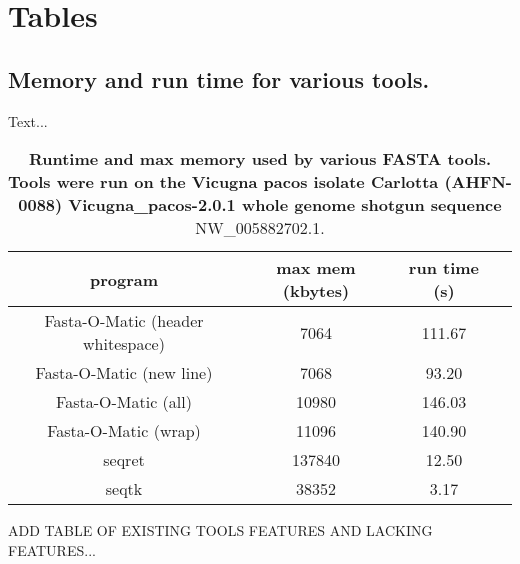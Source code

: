 \section*{Tables}
\subsection{Memory and run time for various tools.}

Text...  

\begin{table}
\begin{center}
    \begin{tabular}{cccc}
        \hline
        \textbf{program} & \textbf{max mem (kbytes)}  & \textbf{run time (s)}  \\ \hline
        Fasta-O-Matic (header whitespace) & 7064 & 111.67 \\
        Fasta-O-Matic (new line) & 7068 & 93.20  \\			  
        Fasta-O-Matic (all)          & 10980      & 146.03     \\   
        Fasta-O-Matic (wrap)          & 11096      & 140.90     \\ 
        seqret          & 137840      & 12.50     \\              
        seqtk          & 38352      & 3.17      \\  \hline
    \end{tabular}
\end{center}
\caption{\textbf{Runtime and max memory used by various FASTA tools. Tools were run on the Vicugna pacos isolate Carlotta (AHFN-0088) Vicugna_pacos-2.0.1 whole genome shotgun sequence} NW_005882702.1.}
\end{table}

ADD TABLE OF EXISTING TOOLS FEATURES AND LACKING FEATURES...

  
  
  